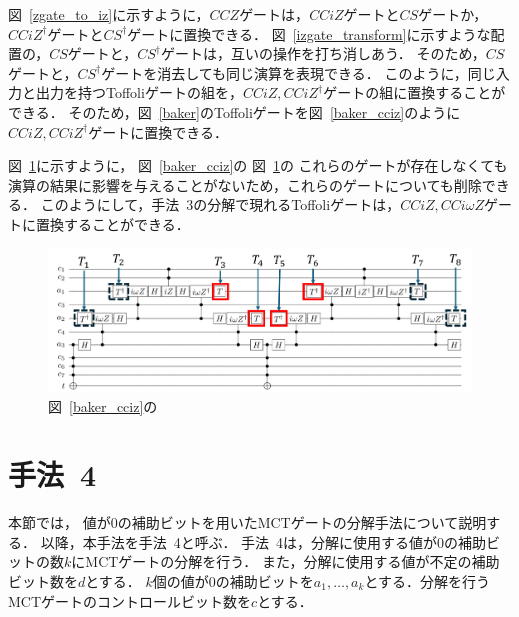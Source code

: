 図~\ref{zgate_to_iz}に示すように，$CCZ$ゲートは，$CCiZ$ゲートと$CS$ゲートか，$CCiZ^{\dag}$ゲートと$CS^{\dag}$ゲートに置換できる．
図~\ref{izgate_transform}に示すような配置の，$CS$ゲートと，$CS^{\dag}$ゲートは，互いの操作を打ち消しあう．
そのため，$CS$ゲートと，$CS^{\dag}$ゲートを消去しても同じ演算を表現できる．
このように，同じ入力と出力を持つToffoliゲートの組を，$CCiZ, CCiZ^{\dag}$ゲートの組に置換することができる．
そのため，図~\ref{baker}のToffoliゲートを図~\ref{baker_cciz}のように$CCiZ, CCiZ^{\dag}$ゲートに置換できる．
\par
図~\ref{baker_cciomegaz}に示すように，
図~\ref{baker_cciz}の
図~\ref{baker_cciomegaz}の
これらのゲートが存在しなくても演算の結果に影響を与えることがないため，これらのゲートについても削除できる．
このようにして，手法~3の分解で現れるToffoliゲートは，$CCiZ, CCi\omega Z$ゲートに置換することができる．
\begin{figure}[tbp]
  \centering
  \includegraphics[width=15cm]{img/baker_iomegaz.pdf}
  \caption{図~\ref{baker_cciz}の}
  \label{baker_cciomegaz}
\end{figure}
\section{手法~4}
本節では，
値が0の補助ビットを用いたMCTゲートの分解手法\cite{niemann2019t}について説明する．
以降，本手法を手法~4と呼ぶ．
手法~4は，分解に使用する値が0の補助ビットの数$k$にMCTゲートの分解を行う．
また，分解に使用する値が不定の補助ビット数を$d$とする．
$k$個の値が0の補助ビットを$a_{1},\dots, a_{k}$とする．分解を行うMCTゲートのコントロールビット数を$c$とする．

